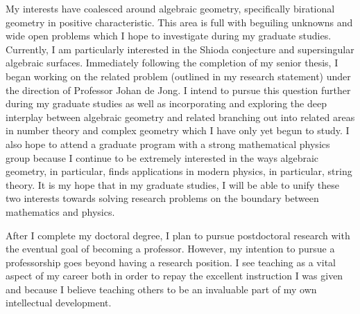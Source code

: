 \documentclass[11pt]{amsart}
\begin{document}
My interests have coalesced around algebraic geometry, specifically birational geometry in positive characteristic. This area is full with beguiling unknowns and wide open problems which I hope to investigate during my graduate studies. Currently, I am particularly interested in the Shioda conjecture and supersingular algebraic surfaces. Immediately following the completion of my senior thesis, I began working on the related problem (outlined in my research statement) under the direction of Professor Johan de Jong. I intend to pursue this question further during my graduate studies as well as incorporating and exploring the deep interplay between algebraic geometry and related branching out into related areas in number theory and complex geometry which I have only yet begun to study. I also hope to attend a graduate program with a strong mathematical physics group because I continue to be extremely interested in the ways algebraic geometry, in particular, finds applications in modern physics, in particular, string theory. It is my hope that in my graduate studies, I will be able to unify these two interests towards solving research problems on the boundary between mathematics and physics.
\par
After I complete my doctoral degree, I plan to pursue postdoctoral research with the eventual goal of becoming a professor. However, my intention to pursue a professorship goes beyond having a research position. I see teaching as a vital aspect of my career both in order to repay the excellent instruction I was given and because I believe teaching others to be an invaluable part of my own intellectual development.




\end{document}
